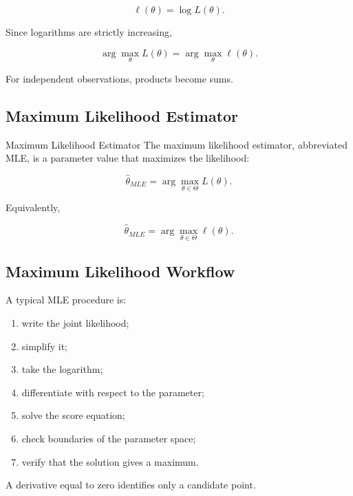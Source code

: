 \[
\boxed{
\ell(\theta)
=
\log L(\theta).
}
\]

Since logarithms are strictly increasing,

\[
\boxed{
\arg\max_\theta L(\theta)
=
\arg\max_\theta \ell(\theta).
}
\]

For independent observations, products become sums.

\subsection{Maximum Likelihood Estimator}
\label{subsec:maximum-likelihood-estimator}

\begin{definitionbox}{Maximum Likelihood Estimator}
The maximum likelihood estimator, abbreviated MLE, is a parameter value
that maximizes the likelihood:

\[
\boxed{
\widehat{\theta}_{MLE}
=
\arg\max_{\theta\in\Theta}
L(\theta).
}
\]
\end{definitionbox}

Equivalently,

\[
\boxed{
\widehat{\theta}_{MLE}
=
\arg\max_{\theta\in\Theta}
\ell(\theta).
}
\]

\subsection{Maximum Likelihood Workflow}
\label{subsec:mle-workflow}

A typical MLE procedure is:

\begin{enumerate}
    \item write the joint likelihood;
    \item simplify it;
    \item take the logarithm;
    \item differentiate with respect to the parameter;
    \item solve the score equation;
    \item check boundaries of the parameter space;
    \item verify that the solution gives a maximum.
\end{enumerate}

A derivative equal to zero identifies only a candidate point.

